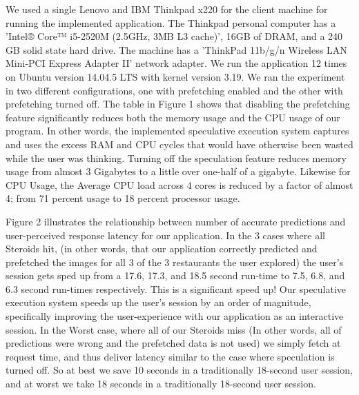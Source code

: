 We used a single Lenovo and IBM Thinkpad x220 for the client machine for running the implemented application. The Thinkpad personal computer has a 'Intel® Core™ i5-2520M (2.5GHz, 3MB L3 cache)', 16GB of DRAM, and a 240 GB solid state hard drive. The machine has a 'ThinkPad 11b/g/n Wireless LAN Mini-PCI Express Adapter II' network adapter. We run the application 12 times on Ubuntu version 14.04.5 LTS with kernel version 3.19. We ran the experiment in two different configurations, one with prefetching enabled and the other with prefetching turned off. The table in Figure 1 shows that disabling the prefetching feature significantly reduces both the memory usage and the CPU usage of our program. In other words, the implemented speculative execution system captures and uses the excess RAM and CPU cycles that would have otherwise been wasted while the user was thinking. Turning off the speculation feature reduces memory usage from almost 3 Gigabytes to a little over one-half of a gigabyte. Likewise for CPU Usage, the Average CPU load across 4 cores is reduced by a factor of almost 4; from 71 percent usage to 18 percent processor usage.

Figure 2 illustrates the relationship between number of accurate predictions and user-perceived response latency for our application. In the 3 cases where all Steroids hit, (in other words, that our application correctly predicted and prefetched the images for all 3 of the 3 restaurants the user explored) the user's session gets sped up from a 17.6, 17.3, and 18.5 second run-time to 7.5, 6.8, and 6.3 second run-times respectively. This is a significant speed up! Our speculative execution system speeds up the user's session by an order of magnitude, specifically improving the user-experience with our application as an interactive session. In the Worst case, where all of our Steroids miss (In other words, all of predictions were wrong and the prefetched data is not used) we simply fetch at request time, and thus deliver latency similar to the case where speculation is turned off. So at best we save 10 seconds in a traditionally 18-second user session, and at worst we take 18 seconds in a traditionally 18-second user session. 

